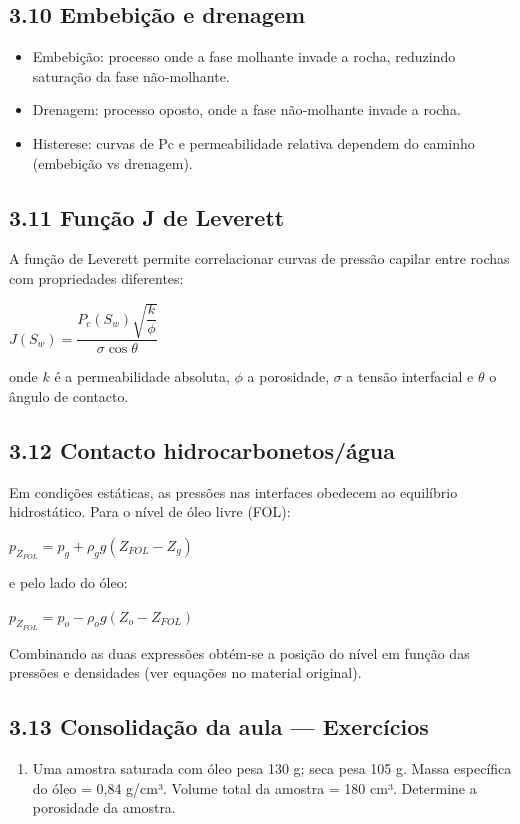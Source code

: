 \documentclass[11pt,a4paper]{article}
\begin{document}
\subsection{3.10 Embebição e drenagem}
\begin{itemize}
\item Embebição: processo onde a fase molhante invade a rocha, reduzindo saturação da fase não‑molhante.
\item Drenagem: processo oposto, onde a fase não‑molhante invade a rocha.
\item Histerese: curvas de Pc e permeabilidade relativa dependem do caminho (embebição vs drenagem).
\end{itemize}

\subsection{3.11 Função J de Leverett}
A função de Leverett permite correlacionar curvas de pressão capilar entre rochas com propriedades diferentes:

$J(S_w)=\dfrac{P_c(S_w)\sqrt{\dfrac{k}{\phi}}}{\sigma\cos\theta}$

onde $k$ é a permeabilidade absoluta, $\phi$ a porosidade, $\sigma$ a tensão interfacial e $\theta$ o ângulo de contacto.

\subsection{3.12 Contacto hidrocarbonetos/água}
Em condições estáticas, as pressões nas interfaces obedecem ao equilíbrio hidrostático. Para o nível de óleo livre (FOL):

$p_{Z_{FOL}} = p_g + \rho_g g (Z_{FOL}-Z_g)$

e pelo lado do óleo:

$p_{Z_{FOL}} = p_o - \rho_o g (Z_o - Z_{FOL})$

Combinando as duas expressões obtém‑se a posição do nível em função das pressões e densidades (ver equações no material original).

\subsection{3.13 Consolidação da aula — Exercícios}
\begin{enumerate}
\item Uma amostra saturada com óleo pesa 130 g; seca pesa 105 g. Massa específica do óleo = 0,84 g/cm³. Volume total da amostra = 180 cm³. Determine a porosidade da amostra.
\end{enumerate}
\end{document}

